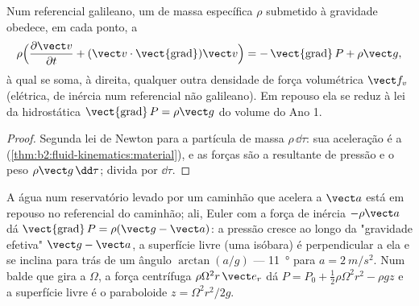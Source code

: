 \begin{theorem}\label{thm:b2:euler-bernoulli:euler}
Num referencial galileano, um  de massa específica $\rho$ submetido
à gravidade obedece, em cada ponto, a
\[
\rho\Bigl(\frac{\partial\vect v}{\partial t} + (\vect v\cdot\operatorname{\vect{grad}})
\vect v\Bigr) = -\operatorname{\vect{grad}}P + \rho\vect g ,
\]
à qual se soma, à direita, qualquer outra densidade de força volumétrica $\vect f_v$ (elétrica, de
inércia num referencial não galileano). Em repouso ela se reduz à
lei da hidrostática $\operatorname{\vect{grad}}P = \rho\vect g$ do
volume do Ano 1.
\end{theorem}

\begin{proof}
Segunda lei de Newton para a partícula de massa $\rho\,\dd\tau$: sua
aceleração é a 
(\cref{thm:b2:fluid-kinematics:material}), e as forças são a resultante
de pressão e o peso $\rho\vect g\,\dd\tau$; divida por $\dd\tau$.
\end{proof}

\begin{example}\label{ex:b2:euler-bernoulli:tank}
A água num reservatório levado por um caminhão que acelera a $\vect a$ está em repouso
no referencial do caminhão; ali, Euler com a força de inércia $-\rho\vect a$
dá $\operatorname{\vect{grad}}P = \rho(\vect g - \vect a)$: a pressão
cresce ao longo da "gravidade efetiva" $\vect g - \vect a$, a superfície
livre (uma isóbara) é perpendicular a ela e se inclina para trás de
um ângulo $\arctan(a/g)$ --- \qty{11}{\degree} para $a = \qty{2}{m/s^2}$. Num
balde que gira a $\Omega$, a força centrífuga $\rho\Omega^2r\,\vect e_r$
dá $P = P_0 + \tfrac12\rho\Omega^2r^2 - \rho gz$ e a superfície livre é
o paraboloide $z = \Omega^2r^2/2g$.
\end{example}

